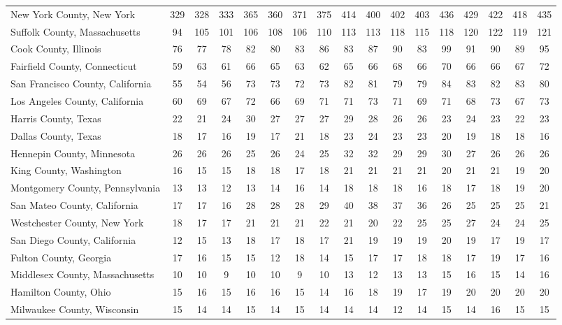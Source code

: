 \begin{landscape}
\begin{longtable}{lcccccccccccccccc}
	New York County, New York & 329 & 328 & 333 & 365 & 360 & 371 & 375 & 414 & 400 & 402 & 403 & 436 & 429 & 422 & 418 & 435 \\
	Suffolk County, Massachusetts & 94 & 105 & 101 & 106 & 108 & 106 & 110 & 113 & 113 & 118 & 115 & 118 & 120 & 122 & 119 & 121 \\
	Cook County, Illinois & 76 & 77 & 78 & 82 & 80 & 83 & 86 & 83 & 87 & 90 & 83 & 99 & 91 & 90 & 89 & 95 \\
	Fairfield County, Connecticut & 59 & 63 & 61 & 66 & 65 & 63 & 62 & 65 & 66 & 68 & 66 & 70 & 66 & 66 & 67 & 72 \\
	San Francisco County, California & 55 & 54 & 56 & 73 & 73 & 72 & 73 & 82 & 81 & 79 & 79 & 84 & 83 & 82 & 83 & 80 \\
	Los Angeles County, California & 60 & 69 & 67 & 72 & 66 & 69 & 71 & 71 & 73 & 71 & 69 & 71 & 68 & 73 & 67 & 73 \\
	Harris County, Texas & 22 & 21 & 24 & 30 & 27 & 27 & 27 & 29 & 28 & 26 & 26 & 23 & 24 & 23 & 22 & 23 \\
	Dallas County, Texas & 18 & 17 & 16 & 19 & 17 & 21 & 18 & 23 & 24 & 23 & 23 & 20 & 19 & 18 & 18 & 16 \\
	Hennepin County, Minnesota & 26 & 26 & 26 & 25 & 26 & 24 & 25 & 32 & 32 & 29 & 29 & 30 & 27 & 26 & 26 & 26 \\
	King County, Washington & 16 & 15 & 15 & 18 & 18 & 17 & 18 & 21 & 21 & 21 & 21 & 20 & 21 & 21 & 19 & 20 \\
	Montgomery County, Pennsylvania & 13 & 13 & 12 & 13 & 14 & 16 & 14 & 18 & 18 & 18 & 16 & 18 & 17 & 18 & 19 & 20 \\
	San Mateo County, California & 17 & 17 & 16 & 28 & 28 & 28 & 29 & 40 & 38 & 37 & 36 & 26 & 25 & 25 & 25 & 21 \\
	Westchester County, New York & 18 & 17 & 17 & 21 & 21 & 21 & 22 & 21 & 20 & 22 & 25 & 25 & 27 & 24 & 24 & 25 \\
	San Diego County, California & 12 & 15 & 13 & 18 & 17 & 18 & 17 & 21 & 19 & 19 & 19 & 20 & 19 & 17 & 19 & 17 \\
	Fulton County, Georgia & 17 & 16 & 15 & 15 & 12 & 18 & 14 & 15 & 17 & 17 & 18 & 18 & 17 & 19 & 17 & 16 \\
	Middlesex County, Massachusetts & 10 & 10 & 9 & 10 & 10 & 9 & 10 & 13 & 12 & 13 & 13 & 15 & 16 & 15 & 14 & 16 \\
	Hamilton County, Ohio & 15 & 16 & 15 & 16 & 16 & 15 & 14 & 16 & 18 & 19 & 17 & 19 & 20 & 20 & 20 & 20 \\
	Milwaukee County, Wisconsin & 15 & 14 & 14 & 15 & 14 & 15 & 14 & 14 & 14 & 12 & 14 & 15 & 14 & 16 & 15 & 15 \\

\end{longtable}
\end{landscape}
